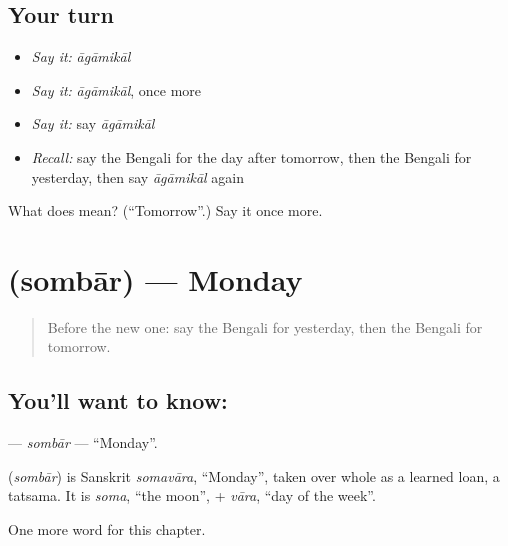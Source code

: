 \subsection*{Your turn}
\begin{itemize}
\raggedright
  \item \emph{Say it:} \emph{āgāmikāl}
  \item \emph{Say it:} \emph{āgāmikāl}, once more
  \item \emph{Say it:} say \emph{āgāmikāl}
  \item \emph{Recall:} say the Bengali for the day after tomorrow, then the Bengali for yesterday, then say \emph{āgāmikāl} again
\end{itemize}

\begin{tcolorbox}[breakable,colback=teal!4,colframe=teal!35!black,title={Before you move on}]
What does  mean? (\textquotedblleft{}Tomorrow\textquotedblright{}.) Say it once more.
\end{tcolorbox}
\section[\texorpdfstring{\bn{সোমবার} (sombār)}{সোমবার (sombār)}]{ (sombār) — Monday}

\label{lesson:BN-C91-sombar}



\begin{quote}
Before the new one: say the Bengali for yesterday, then the Bengali for tomorrow.
\end{quote}

\subsection*{You'll want to know: }
\textbf{} — \emph{sombār} — \textquotedblleft{}Monday\textquotedblright{}.

\begin{cousinweb}
\textbf{} (\emph{sombār}) is Sanskrit \emph{somavāra}, \textquotedblleft{}Monday\textquotedblright{}, taken over whole as a learned loan, a tatsama. It is \emph{soma}, \textquotedblleft{}the moon\textquotedblright{}, + \emph{vāra}, \textquotedblleft{}day of the week\textquotedblright{}.
\end{cousinweb}

\begin{grammarlens}[title={What you've built}]
One more word for this chapter.
\end{grammarlens}

